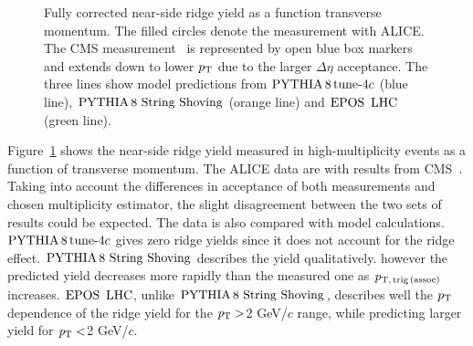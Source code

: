 \begin{figure}[h!]
	\centering
	\caption{ Fully corrected near-side ridge yield as a function transverse momentum. The filled circles denote the measurement with ALICE. The CMS measurement~\cite{Khachatryan:2015lva} is represented by open blue box markers and extends down to lower $p_\mathrm{T}$ due to the larger $\Delta\eta$ acceptance. The three lines show model predictions from $\mathrm{PYTHIA}\,8\,\mathrm{tune}{\text -}4c$ (blue line), ${\mathrm{PYTHIA}\,8~\mathrm{String}~}\mathrm{Shoving}$ (orange line) and ${\mathrm{EPOS}\,~\mathrm{LHC}}$ (green line).}
	\label{fig:PlotYSpect}
\end{figure}

Figure~\ref{fig:PlotYSpect} shows the near-side ridge yield measured in high-multiplicity events as a function of transverse momentum. The ALICE data are with results from CMS~\cite{Khachatryan:2015lva}.
Taking into account the differences in acceptance of both measurements and chosen multiplicity estimator, the slight disagreement between the two sets of results could be expected. The data is also compared with model calculations. $\mathrm{PYTHIA}\,8\,\mathrm{tune}{\text -}4c$ gives zero ridge yields since it does not account for the ridge effect. ${\mathrm{PYTHIA}\,8~\mathrm{String}~}\mathrm{Shoving}$ describes the yield qualitatively. however the predicted yield decreases more rapidly than the measured one as $p_\mathrm{T,\,trig\,(assoc)}$ increases. ${\mathrm{EPOS}\,~\mathrm{LHC}}$, unlike ${\mathrm{PYTHIA}\,8~\mathrm{String}~}\mathrm{Shoving}$, describes well the $p_\mathrm{T}$ dependence of the ridge yield for the $\it{p}_{\rm{T}}>$2 GeV/$c$ range, while predicting larger yield for $\it{p}_{\rm{T}}<$2 GeV/$c$.

